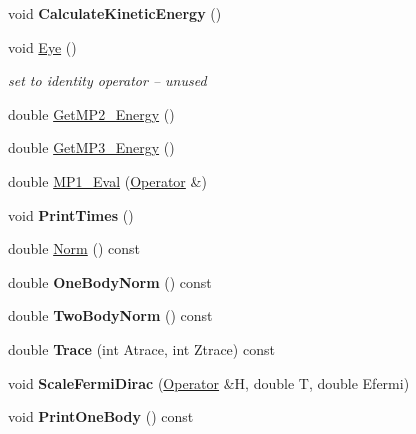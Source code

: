 \begin{DoxyCompactItemize}
\item 
\mbox{\label{classOperator_a701c64f8be794e89fd28a643b56d534a}} 
void {\bfseries Calculate\+Kinetic\+Energy} ()
\item 
\mbox{\label{classOperator_a03a378f0da2fe71d8160bd3262891457}} 
void \hyperlink{classOperator_a03a378f0da2fe71d8160bd3262891457}{Eye} ()
\begin{DoxyCompactList}\small\item\em set to identity operator -- unused \end{DoxyCompactList}\item 
double \hyperlink{classOperator_ad7639b562a3df5215000677b1dc499e6}{Get\+M\+P2\+\_\+\+Energy} ()
\item 
double \hyperlink{classOperator_ac12117e2c500dff8ab5d532573793290}{Get\+M\+P3\+\_\+\+Energy} ()
\item 
double \hyperlink{classOperator_a85d082bf283e568e1dd5bce4dc362d41}{M\+P1\+\_\+\+Eval} (\hyperlink{classOperator}{Operator} \&)
\item 
\mbox{\label{classOperator_aa8280e8e2c6be73a9594789127b939c1}} 
void {\bfseries Print\+Times} ()
\item 
double \hyperlink{classOperator_af8f53905406e3322abbc1a4c594c1d22}{Norm} () const
\item 
\mbox{\label{classOperator_a15273faba089a1302d04606b8f622bdb}} 
double {\bfseries One\+Body\+Norm} () const
\item 
\mbox{\label{classOperator_a967be88774aa400d2f6b85ecb8e623b7}} 
double {\bfseries Two\+Body\+Norm} () const
\item 
\mbox{\label{classOperator_a810500e187c3f06848ecd6bf7256e319}} 
double {\bfseries Trace} (int Atrace, int Ztrace) const
\item 
\mbox{\label{classOperator_a1dac4ba672e0c86f79320b28c210e9a5}} 
void {\bfseries Scale\+Fermi\+Dirac} (\hyperlink{classOperator}{Operator} \&H, double T, double Efermi)
\item 
\mbox{\label{classOperator_a68de7d0bfd20e71a3ca95b0d2e7202dc}} 
void {\bfseries Print\+One\+Body} () const

\end{DoxyCompactItemize}
